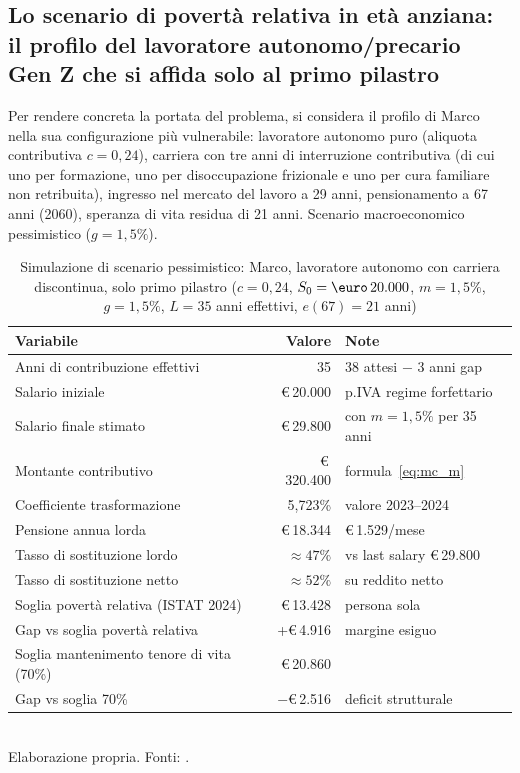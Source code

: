 \subsection{Lo scenario di povertà relativa in età anziana:
            il profilo del lavoratore autonomo/precario Gen Z
            che si affida solo al primo pilastro}
\label{subsec:scenario_poverta}

Per rendere concreta la portata del problema, si considera il profilo di
Marco nella sua configurazione più vulnerabile: lavoratore autonomo puro
(aliquota contributiva \(c = 0{,}24\)), carriera con tre anni di interruzione
contributiva (di cui uno per formazione, uno per disoccupazione frizionale
e uno per cura familiare non retribuita), ingresso nel mercato del lavoro
a 29 anni, pensionamento a 67 anni (2060), speranza di vita residua di
21 anni. Scenario macroeconomico pessimistico (\(g = 1{,}5\%\)).

\begin{table}[htbp]
\centering
\caption{Simulazione di scenario pessimistico: Marco, lavoratore autonomo
         con carriera discontinua, solo primo pilastro
         (\(c=0{,}24\), \(S_0=\text{\euro}\,20.000\), \(m=1{,}5\%\),
          \(g=1{,}5\%\), \(L=35\) anni effettivi, \(e(67)=21\) anni)}
\label{tab:scenario_poverta}
\begin{tabular}{lrl}
\toprule
Variabile & Valore & Note \\
\midrule
Anni di contribuzione effettivi & 35 & 38 attesi $-$ 3 anni gap \\
Salario iniziale & \euro\,20.000 & p.IVA regime forfettario \\
Salario finale stimato & \euro\,29.800 & con \(m=1{,}5\%\) per 35 anni \\
Montante contributivo & \euro\,320.400 & formula~\eqref{eq:mc_m} \\
Coefficiente trasformazione & 5,723\% & valore 2023--2024 \\
Pensione annua lorda & \euro\,18.344 & \euro\,1.529/mese \\
Tasso di sostituzione lordo & $\approx 47\%$ & vs last salary \euro\,29.800 \\
Tasso di sostituzione netto & $\approx 52\%$ & su reddito netto \\
\midrule
Soglia povertà relativa (ISTAT 2024) & \euro\,13.428 & persona sola\\
Gap vs soglia povertà relativa & +\euro\,4.916 & margine esiguo \\
Soglia mantenimento tenore di vita (70\%) & \euro\,20.860 & \\
Gap vs soglia 70\% & $-$\euro\,2.516 & deficit strutturale \\
\bottomrule
\end{tabular}
\smallskip\\
\footnotesize
Elaborazione propria. Fonti: \cite{MEFRGS2025, ISTAT2024, Bosi2018}.
\end{table}

